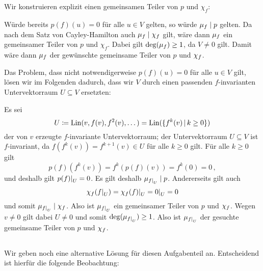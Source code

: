\section{}





\subsection{}

Wir konstruieren explizit einen gemeinsamen Teiler von $p$ und $\chi_f$:

Würde bereits $p(f)(u) = 0$ für alle $u \in V$ gelten, so würde $\mu_{f} \mathrel{|} p$ gelten.
Da nach dem Satz von Cayley-Hamilton auch $\mu_{f} \mathrel{|} \chi_{f}$ gilt, wäre dann $\mu_{f}$ ein gemeinsamer Teiler von $p$ und $\chi_f$.
Dabei gilt $\deg(\mu_{f}) \geq 1$, da $V \neq 0$ gilt.
Damit wäre dann $\mu_{f}$ der gewünschte gemeinsame Teiler von $p$ und $\chi_{f}$.

Das Problem, dass nicht notwendigerweise $p(f)(u) = 0$ für alle $u \in V$ gilt, lösen wir im Folgenden dadurch, dass wir $V$ durch einen passenden $f$-invarianten Untervektorraum $U \subseteq V$ ersetzten:

Es sei
\[
            U
  \defined  \Lin(v, f(v), f^2(v), \dotsc)
  =         \Lin( \{ f^k(v) \suchthat k \geq 0 \} )
\]
der von $v$ erzeugte $f$-invariante Untervektorraum;
der Untervektorraum $U \subseteq V$ ist $f$-invariant, da $f(f^k(v)) = f^{k+1}(v) \in U$ für alle $k \geq 0$ gilt.
Für alle $k \geq 0$ gilt
\[
    p(f)( f^k(v) )
  = f^k( p(f)(v) )
  = f^k( 0 )
  = 0 \,,
\]
und deshalb gilt $\restrict{p(f)}{U} = 0$.
Es gilt deshalb $\minpoly{\restrict{f}{U}} \divides p$.
Andererseits gilt auch
\[
    \charpoly{f}(\restrict{f}{U})
  = \restrict{\charpoly{f}(f)}{U}
  = \restrict{0}{U}
  = 0
\]
und somit $\minpoly{\restrict{f}{U}} \divides \charpoly{f}$.
Also ist $\minpoly{\restrict{f}{U}}$ ein gemeinsamer Teiler von $p$ und $\chi_{f}$.
Wegen $v \neq 0$ gilt dabei $U \neq 0$ und somit $\deg( \minpoly{\restrict{f}{U}} ) \geq 1$.
Also ist $\minpoly{\restrict{f}{U}}$ der gesuchte gemeinsame Teiler von $p$ und $\chi_{f}$.





\subsection{}

Wir geben noch eine alternative Lösung für diesen Aufgabenteil an.
Entscheidend ist hierfür die folgende Beobachtung:

